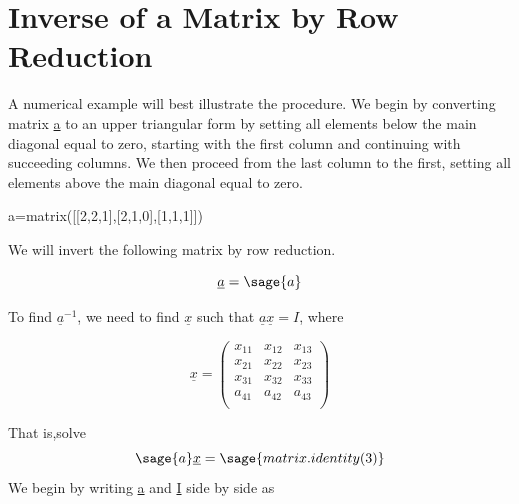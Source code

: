 \documentclass[12pt]{report}
\begin{document}
 
\section[Row Reduction]{Inverse of a Matrix by Row Reduction}\label{last}

A numerical example will best illustrate the procedure. We begin by
converting matrix \underline{a} to an upper triangular form by setting
all elements below the main diagonal equal to zero, starting with the
first column and continuing with succeeding columns. We then proceed
from the last column to the first, setting all elements above the main
diagonal equal to zero.

\begin{sagesilent}
	a=matrix([[2,2,1],[2,1,0],[1,1,1]])
\end{sagesilent}
We will invert the following matrix by row reduction.

\begin{equation}
	\underline{a} = \sage{a}
\end{equation}

To find $\underline{a}^{-1}$, we need to find $\underline{x}$ such that
$\underline{a}\underline{x}=I$, where

\begin{equation}
	\underline{x}=\left(\begin{array}{rrr}
	x_{11} & x_{12} & x_{13} \\
	x_{21} & x_{22} & x_{23} \\
	x_{31} & x_{32} & x_{33} \\
	a_{41} & a_{42} & a_{43}  \\
	\end{array}\right)
\end{equation}

That is,solve\begin{equation} \sage{a}\underline{x} = \sage{matrix.identity(3)}\end{equation}
We begin by writing \underline{a} and \underline{I} side by side as
\end{document}
